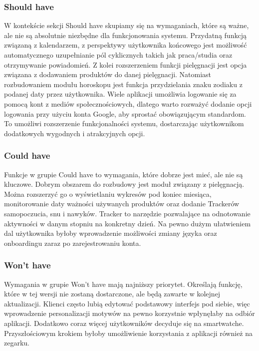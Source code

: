 \subsubsection*{\textbf{Should have}}
\phantom{Th}
W kontekście sekcji Should have skupiamy się na wymaganiach, które są ważne, ale nie są absolutnie niezbędne dla funkcjonowania systemu.
Przydatną funkcją związaną z kalendarzem, z perspektywy użytkownika końcowego jest możliwość automatycznego uzupełnianie pól cyklicznych
takich jak praca/studia oraz otrzymywanie powiadomień. Z kolei rozszerzeniem funkcji pielęgnacji jest opcja związana z dodawaniem
produktów do danej pielęgnacji. Natomiast rozbudowaniem modułu horoskopu jest funkcja przydzielania znaku zodiaku
z podanej daty przez użytkownika. Wiele aplikacji umożliwia logowanie się za pomocą kont z mediów społecznościowych, dlatego warto rozważyć dodanie opcji logowania przy użyciu konta Google, aby sprostać obowiązującym standardom. To umożliwi rozszerzenie funkcjonalności systemu, dostarczając użytkownikom dodatkowych wygodnych i atrakcyjnych opcji.

\subsubsection*{\textbf{Could have}}
\phantom{Th}
Funkcje w grupie Could have to wymagania, które dobrze jest mieć, ale nie są kluczowe.
Dobrym obszarem do rozbudowy jest moduł związany z pielęgnacją.
Można rozszerzyć go o wyświetlaniu wykresów pod koniec miesiąca,
monitorowanie daty ważności używanych produktów oraz dodanie Trackerów samopoczucia, snu i nawyków.
Tracker to narzędzie pozwalające na odnotowanie aktywności w danym stopniu na konkretny dzień.
Na pewno dużym ułatwieniem dal użytkownika byłoby wprowadzenie możliwości zmiany języka oraz onboardingu zaraz po zarejestrowaniu konta.

\subsubsection*{\textbf{Won't have}}
\phantom{Th}
Wymagania w grupie Won't have mają najniższy priorytet. Określają funkcję, które w tej wersji nie zostaną dostarczone,
ale będą zawarte w kolejnej aktualizacji. Klienci często lubią edytować podstawowy interfejs pod siebie,
więc wprowadzenie personalizacji motywów na pewno korzystnie wpłynęłaby na odbiór aplikacji.
Dodatkowo coraz więcej użytkowników decyduje się na smartwatche.
Przyszłościowym krokiem byłoby umożliwienie korzystania z aplikacji również na zegarku.